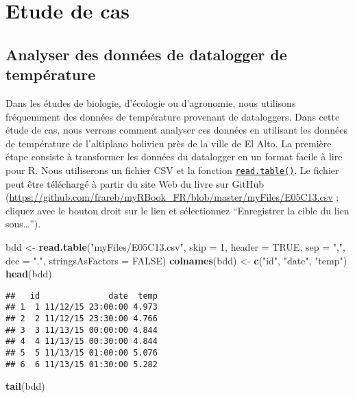 \documentclass[]{book}
\newenvironment{Shaded}{\begin{snugshade}}{\end{snugshade}}
\newcommand{\KeywordTok}[1]{\textcolor[rgb]{0.13,0.29,0.53}{\textbf{#1}}}
\newcommand{\DataTypeTok}[1]{\textcolor[rgb]{0.13,0.29,0.53}{#1}}
\newcommand{\DecValTok}[1]{\textcolor[rgb]{0.00,0.00,0.81}{#1}}
\newcommand{\StringTok}[1]{\textcolor[rgb]{0.31,0.60,0.02}{#1}}
\newcommand{\OtherTok}[1]{\textcolor[rgb]{0.56,0.35,0.01}{#1}}
\newcommand{\NormalTok}[1]{#1}
\theoremstyle{definition}
\theoremstyle{definition}
\theoremstyle{definition}
\theoremstyle{remark}
\begin{document}
\part{Etude de cas}\label{part-etude-de-cas}

\hypertarget{studyCase001}{\chapter{Analyser des données de datalogger
de température}\label{studyCase001}}

Dans les études de biologie, d'écologie ou d'agronomie, nous utilisons
fréquemment des données de température provenant de dataloggers. Dans
cette étude de cas, nous verrons comment analyser ces données en
utilisant les données de température de l'altiplano bolivien près de la
ville de El Alto. La première étape consiste à transformer les données
du datalogger en un format facile à lire pour R. Nous utiliserons un
fichier CSV et la fonction
\protect\hyperlink{import}{\texttt{read.table()}}. Le fichier peut être
téléchargé à partir du site Web du livre sur GitHub
(\url{https://github.com/frareb/myRBook_FR/blob/master/myFiles/E05C13.csv}
; cliquez avec le bouton droit sur le lien et sélectionnez ``Enregistrer
la cible du lien sous\ldots{}'').

\begin{Shaded}
\begin{Highlighting}[]
\NormalTok{bdd <-}\StringTok{ }\KeywordTok{read.table}\NormalTok{(}\StringTok{"myFiles/E05C13.csv"}\NormalTok{, }\DataTypeTok{skip =} \DecValTok{1}\NormalTok{, }\DataTypeTok{header =} \OtherTok{TRUE}\NormalTok{, }
  \DataTypeTok{sep =} \StringTok{","}\NormalTok{, }\DataTypeTok{dec =} \StringTok{"."}\NormalTok{, }\DataTypeTok{stringsAsFactors =} \OtherTok{FALSE}\NormalTok{)}
\KeywordTok{colnames}\NormalTok{(bdd) <-}\StringTok{ }\KeywordTok{c}\NormalTok{(}\StringTok{"id"}\NormalTok{, }\StringTok{"date"}\NormalTok{, }\StringTok{"temp"}\NormalTok{)}
\KeywordTok{head}\NormalTok{(bdd)}
\end{Highlighting}
\end{Shaded}

\begin{verbatim}
##   id              date  temp
## 1  1 11/12/15 23:00:00 4.973
## 2  2 11/12/15 23:30:00 4.766
## 3  3 11/13/15 00:00:00 4.844
## 4  4 11/13/15 00:30:00 4.844
## 5  5 11/13/15 01:00:00 5.076
## 6  6 11/13/15 01:30:00 5.282
\end{verbatim}

\begin{Shaded}
\begin{Highlighting}[]
\KeywordTok{tail}\NormalTok{(bdd)}
\end{Highlighting}
\end{Shaded}
\end{document}
